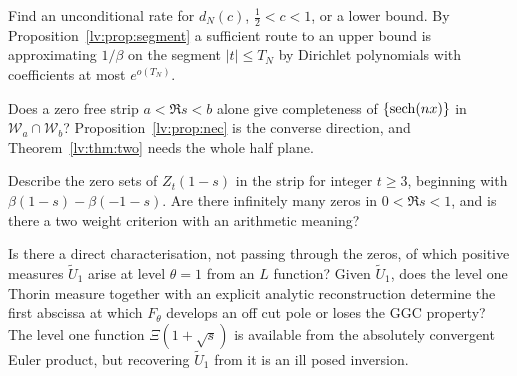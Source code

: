 \begin{problem}\label{lv:prob:rate}
Find an unconditional rate for $d_N(c)$, $\frac12<c<1$, or a lower bound. By Proposition~\ref{lv:prop:segment} a sufficient route to an upper bound is approximating $1/\beta$ on the segment $|t|\le T_N$ by Dirichlet polynomials with coefficients at most $e^{o(T_N)}$.
\end{problem}

\begin{problem}\label{lv:prob:strip}
Does a zero free strip $a<\Re s<b$ alone give completeness of $\{\operatorname{sech}(nx)\}$ in $\mathcal W_a\cap\mathcal W_b$? Proposition~\ref{lv:prop:nec} is the converse direction, and Theorem~\ref{lv:thm:two} needs the whole half plane.
\end{problem}

\begin{problem}
Describe the zero sets of $Z_t(1-s)$ in the strip for integer $t\ge3$, beginning with $\beta(1-s)-\beta(-1-s)$. Are there infinitely many zeros in $0<\Re s<1$, and is there a two weight criterion with an arithmetic meaning?
\end{problem}

\begin{problem}\label{lv:prob:down}
Is there a direct characterisation, not passing through the zeros, of which positive measures $\widetilde U_1$ arise at level $\theta=1$ from an $L$ function? Given $\widetilde U_1$, does the level one Thorin measure together with an explicit analytic reconstruction determine the first abscissa at which $F_\theta$ develops an off cut pole or loses the GGC property? The level one function $\Xi(1+\sqrt s)$ is available from the absolutely convergent Euler product, but recovering $\widetilde U_1$ from it is an ill posed inversion.
\end{problem}
